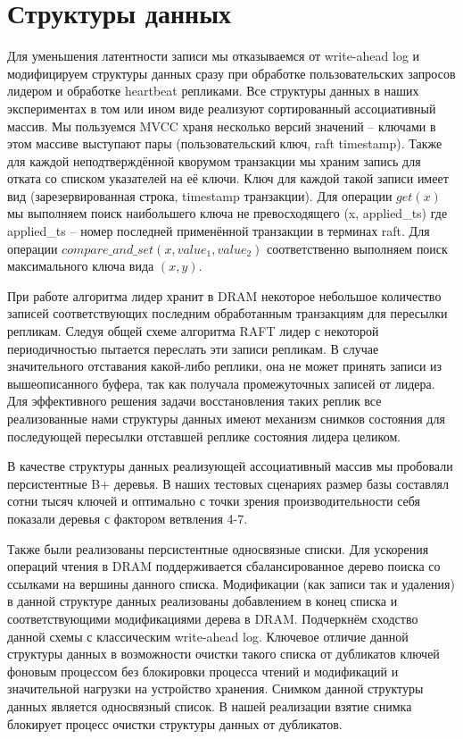 \documentclass[pdftex,ptm,12pt,a4paper]{report}
\theoremstyle{definition}
\begin{document}
\section{Структуры данных}
\label{datastructures}
Для уменьшения латентности записи мы отказываемся от write-ahead log и модифицируем структуры данных сразу при обработке пользовательских запросов лидером
и обработке heartbeat репликами. Все структуры данных в наших экспериментах в том или ином виде реализуют сортированный ассоциативный массив.
Мы пользуемся MVCC \cite{bernstein1983multiversion} храня несколько версий значений -- ключами в этом массиве выступают пары (пользовательский ключ, raft timestamp).
Также для каждой неподтверждённой кворумом транзакции мы храним запись для отката со списком указателей на её ключи. Ключ для каждой такой записи имеет вид
(зарезервированная строка, timestamp транзакции).
Для операции $get(x)$ мы выполняем поиск наибольшего ключа не превосходящего (x, applied\_ts) где applied\_ts -- номер последней применённой транзакции в терминах raft.
Для операции $compare\_and\_set(x, value_1, value_2)$ соответственно выполняем поиск максимального ключа вида $(x, y).$

При работе алгоритма лидер хранит в DRAM некоторое небольшое количество записей соответствующих последним обработанным транзакциям для пересылки репликам.
Следуя общей схеме алгоритма RAFT лидер с некоторой периодичностью пытается переслать эти записи репликам. В случае значительного отставания какой-либо реплики, она не может
принять записи из вышеописанного буфера, так как получала промежуточных записей от лидера. Для эффективного решения задачи восстановления таких реплик все реализованные нами
структуры данных имеют механизм снимков состояния для последующей пересылки отставшей реплике состояния лидера целиком.

В качестве структуры данных реализующей ассоциативный массив мы пробовали персистентные B+ деревья. В наших тестовых сценариях размер базы составлял сотни тысяч ключей и
оптимально с точки зрения производительности себя показали деревья с фактором ветвления 4-7.

Также были реализованы персистентные односвязные списки. Для ускорения операций чтения в DRAM поддерживается сбалансированное дерево поиска со ссылками на вершины данного списка.
Модификации (как записи так и удаления) в данной структуре данных реализованы добавлением в конец списка и соответствующими модификациями дерева в DRAM.
Подчеркнём сходство данной схемы с классическим write-ahead log. Ключевое отличие данной структуры данных в возможности очистки такого списка от дубликатов ключей фоновым
процессом без блокировки процесса чтений и модификаций и значительной нагрузки на устройство хранения. Снимком данной структуры данных является односвязный список.
В нашей реализации взятие снимка блокирует процесс очистки структуры данных от дубликатов.
\end{document}
